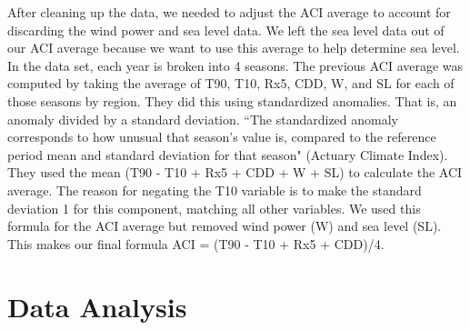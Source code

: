 \documentclass[12pt]{report}
\begin{document}
		\par After cleaning up the data, we needed to adjust the ACI average to account for discarding the wind power and sea level data. We left the sea level data out of our ACI average because we want to use this average to help determine sea level. In the data set, each year is broken into 4 seasons. The previous ACI average was computed by taking the average of T90, T10, Rx5, CDD, W, and SL for each of those seasons by region. They did this using standardized anomalies. That is, an anomaly divided by a standard deviation. \textquotedblleft The standardized anomaly corresponds to how unusual that season's value is, compared to the reference period mean and standard deviation for that season" (Actuary Climate Index). They used the mean (T90 - T10 + Rx5 + CDD + W + SL) to calculate the ACI average. The reason for negating the T10 variable is to make the standard deviation 1 for this component, matching all other variables. We used this formula for the ACI average but removed wind power (W) and sea level (SL). This makes our final formula ACI = (T90 - T10 + Rx5 + CDD)/4.
		
\section* {Data Analysis} 
		
\end{document}
